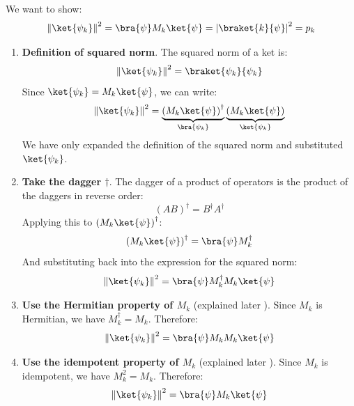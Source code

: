 \begin{deepeningbox}[: Why $\|\ket{\psi_k}\|^2 = p_k$?]
  We want to show:
  \begin{equation*}
    \left\| \ket{\psi_{k}} \right\|^{2} = \bra{\psi} M_{k} \ket{\psi} = \left|\braket{k}{\psi}\right|^{2} = p_{k}
  \end{equation*}
  \begin{enumerate}
    \item \textbf{Definition of squared norm}. The squared norm of a ket is:
    \begin{equation*}
      \left\| \ket{\psi_{k}} \right\|^{2} = \braket{\psi_{k}}{\psi_{k}}
    \end{equation*}
    Since $\ket{\psi_k} = M_k \ket{\psi}$, we can write:
    \begin{equation*}
      \left\| \ket{\psi_{k}} \right\|^{2} = \underbrace{\left(M_k \ket{\psi}\right)^{\dagger}}_{\bra{\psi_k}} \underbrace{\left(M_k \ket{\psi}\right)}_{\ket{\psi_k}}
    \end{equation*}
    We have only expanded the definition of the squared norm and substituted $\ket{\psi_k}$.

    \item \textbf{Take the dagger $\dagger$}. The dagger of a product of operators is the product of the daggers in reverse order:
    \begin{equation*}
      \left(A B\right)^{\dagger} = B^{\dagger} A^{\dagger}
    \end{equation*}
    Applying this to $\left(M_k \ket{\psi}\right)^{\dagger}$:
    \begin{equation*}
      \left(M_k \ket{\psi}\right)^{\dagger} = \bra{\psi} M_k^{\dagger}
    \end{equation*}
    And substituting back into the expression for the squared norm:
    \begin{equation*}
      \left\| \ket{\psi_{k}} \right\|^{2} = \bra{\psi} M_k^{\dagger} M_k \ket{\psi}
    \end{equation*}
    
    \item \textbf{Use the Hermitian property of $M_k$} (explained later ). Since $M_k$ is Hermitian, we have $M_k^{\dagger} = M_k$. Therefore:
    \begin{equation*}
      \left\| \ket{\psi_{k}} \right\|^{2} = \bra{\psi} M_k M_k \ket{\psi}
    \end{equation*}

    \item \textbf{Use the idempotent property of $M_k$} (explained later ). Since $M_k$ is idempotent, we have $M_k^2 = M_k$. Therefore:
    \begin{equation*}
      \left\| \ket{\psi_{k}} \right\|^{2} = \bra{\psi} M_k \ket{\psi}
    \end{equation*}


\end{enumerate}
\end{deepeningbox}

